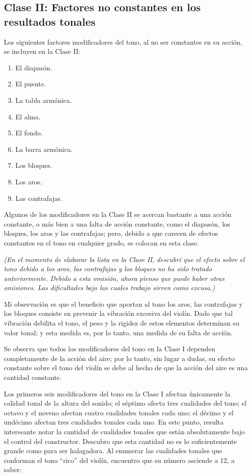 \documentclass[12pt]{book}
\begin{document}
\subsection*{Clase II: Factores no constantes en los resultados tonales}

Los siguientes factores modificadores del tono, al no ser constantes en su acción, se incluyen en la Clase II:

\begin{enumerate}
    \item El diapasón.
    \item El puente.
    \item La tabla armónica.
    \item El alma.
    \item El fondo.
    \item La barra armónica.
    \item Los bloques.
    \item Los aros.
    \item Las contrafajas.
\end{enumerate}

Algunos de los modificadores en la Clase II se acercan bastante a una acción constante, o más bien a una falta de acción constante, como el diapasón, los bloques, los aros y las contrafajas; pero, debido a que carecen de efectos constantes en el tono en cualquier grado, se colocan en esta clase.

\textit{(En el momento de elaborar la lista en la Clase II, descubrí que el efecto sobre el tono debido a los aros, las contrafajas y los bloques no ha sido tratado anteriormente. Debido a esta omisión, ahora pienso que puede haber otras omisiones. Las dificultades bajo las cuales trabajo sirven como excusa.)} 

Mi observación es que el beneficio que aportan al tono los aros, las contrafajas y los bloques consiste en prevenir la vibración excesiva del violín. Dado que tal vibración debilita el tono, el peso y la rigidez de estos elementos determinan su valor tonal; y esta medida es, por lo tanto, una medida de su falta de acción.

Se observa que todos los modificadores del tono en la Clase I dependen completamente de la acción del aire; por lo tanto, sin lugar a dudas, su efecto constante sobre el tono del violín se debe al hecho de que la acción del aire es una cantidad constante. 

Los primeros seis modificadores del tono en la Clase I afectan únicamente la calidad tonal de la altura del sonido; el séptimo afecta tres cualidades del tono; el octavo y el noveno afectan cuatro cualidades tonales cada uno; el décimo y el undécimo afectan tres cualidades tonales cada uno.
En este punto, resulta interesante notar la cantidad de cualidades tonales que están absolutamente bajo el control del constructor. Descubro que esta cantidad no es lo suficientemente grande como para ser halagadora. Al enumerar las cualidades tonales que conforman el tono ``rico'' del violín, encuentro que su número asciende a 12, a saber:
\end{document}
